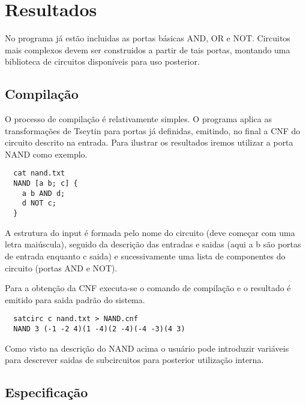 \section{Resultados}
\label{sec:resultados}

No programa já estão incluidas as portas básicas AND, OR e NOT. Circuitos mais
complexos devem ser construidos a partir de tais portas, montando uma
biblioteca de circuitos disponíveis para uso posterior.

\subsection{Compilação}
\label{sec:compilacao}

O processo de compilação é relativamente simples. O programa aplica as
transformações de Tseytin para portas já definidas, emitindo, no final
a CNF do circuito descrito na entrada. Para ilustrar os resultados
iremos utilizar a porta NAND como exemplo.
\begin{lstlisting}
  cat nand.txt
  NAND [a b; c] {
    a b AND d;
    d NOT c;
  }
\end{lstlisting}
A estrutura do input é formada pelo nome do circuito (deve começar com uma
letra maiúscula), seguido da descrição das entradas e saidas (aqui a b são
portas de entrada enquanto c saida) e sucessivamente uma lista de componentes
do circuito (portas AND e NOT).

Para a obtenção da CNF executa-se o comando de compilação e o resultado é
emitido para saida padrão do sistema.
\begin{lstlisting}
  satcirc c nand.txt > NAND.cnf
  NAND 3 (-1 -2 4)(1 -4)(2 -4)(-4 -3)(4 3)
\end{lstlisting}
Como visto na descrição do NAND acima o usuário pode introduzir variáveis
para descrever saidas de subcircuitos para posterior utilização interna.

\subsection{Especificação}
\label{sec:espec}

